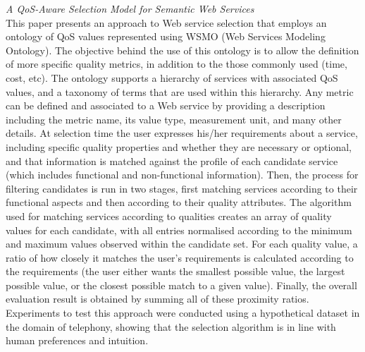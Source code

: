 \textit{A QoS-Aware Selection Model for Semantic Web Services \cite{wang2006qos}}\\
This paper presents an approach to Web service selection that employs an ontology of QoS values represented using WSMO (Web Services Modeling Ontology). The objective behind the use of this ontology is to allow the definition of more specific quality metrics, in addition to the those commonly used (time, cost, etc). The ontology supports a hierarchy of services with associated QoS values, and a taxonomy of terms that are used within this hierarchy. Any metric can be defined and associated to a Web service by providing a description including the metric name, its value type, measurement unit, and many other details. At selection time the user expresses his/her requirements about a service, including specific quality properties and whether they are necessary or optional, and that information is matched against the profile of each candidate service (which includes functional and non-functional information). Then, the process for filtering candidates is run in two stages, first matching services according to their functional aspects and then according to their quality attributes. The algorithm used for matching services according to qualities creates an array of quality values for each candidate, with all entries normalised according to the minimum and maximum values observed within the candidate set. For each quality value, a ratio of how closely it matches the user's requirements is calculated according to the requirements (the user either wants the smallest possible value, the largest possible value, or the closest possible match to a given value). Finally, the overall evaluation result is obtained by summing all of these proximity ratios. Experiments to test this approach were conducted using a hypothetical dataset in the domain of telephony, showing that the selection algorithm is in line with human preferences and intuition.

